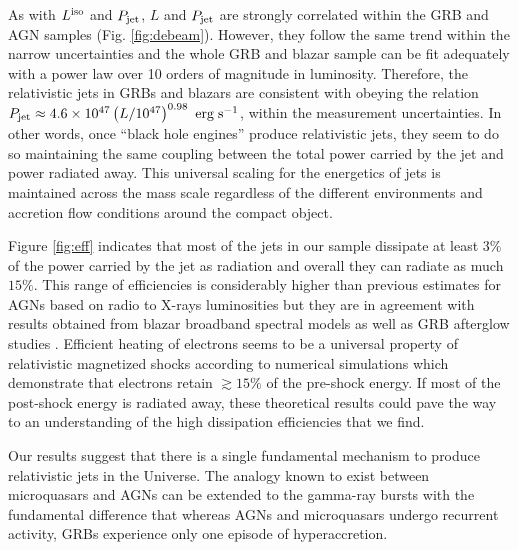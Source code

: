 \documentclass[12pt]{article}
\begin{document}
As with $L^{\rm iso}$ and $P_{\rm jet}$, $L$ and $P_{\rm jet}$ are strongly correlated within the GRB and AGN samples (Fig. \ref{fig:debeam}). However, they follow the same trend within the narrow uncertainties and the whole GRB and blazar sample can be fit adequately with a power law over 10 orders of magnitude in luminosity. 
Therefore, the relativistic jets in GRBs and blazars are consistent with obeying the relation $P_{\rm jet} \approx 4.6 \times 10^{47} \left( L/10^{47} \right)^{0.98} \ {\rm erg \; s}^{-1}$, within the measurement uncertainties.
%
In other words, once ``black hole engines'' produce relativistic jets, they seem to do so maintaining the same coupling 
between the total power carried by the jet and power radiated away. This universal scaling for the energetics of jets is maintained across the mass scale regardless of the different environments and accretion flow conditions around the compact object. 

Figure \ref{fig:eff} indicates that most of the jets in our sample dissipate at least $3\%$ of the power carried by the jet as radiation and overall they can radiate as much $15\%$. This range of efficiencies is considerably higher than previous estimates for AGNs based on radio to X-rays luminosities  \cite{celotti93,yuan09} but they are in agreement with results obtained from blazar broadband spectral models \cite{celotti08,ghise10} as well as GRB afterglow studies \cite{fan06,zhang07,racusin11}.
Efficient heating of electrons seems to be a universal property of relativistic magnetized shocks according to numerical simulations \cite{sironi11} which demonstrate that electrons retain $\gtrsim 15\%$ of the pre-shock energy. If most of the post-shock energy is radiated away, these theoretical results could pave the way to an understanding of the high dissipation efficiencies that we find.

Our results suggest that there is a single fundamental mechanism to produce relativistic jets in the Universe. The analogy known to exist between microquasars and AGNs \cite{mirabel99,marscher02,merloni03} can be extended to the gamma-ray bursts with the fundamental difference that whereas AGNs and microquasars undergo recurrent activity, GRBs experience only one episode of hyperaccretion.
\end{document}
